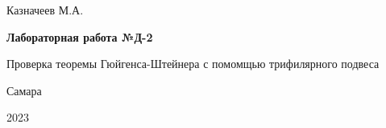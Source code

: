 \begin{titlepage}
	\begin{center}
		\Large{Казначеев М.А.}
	\end{center}
	\vspace*{\fill}
	\begin{center}
		\LARGE\textbf{Лабораторная работа №Д-2}
		
		\addvspace{1em}
		
		\Large{Проверка теоремы Гюйгенса-Штейнера с помомщью трифилярного подвеса}
		
	\end{center}
	\vspace*{\fill}
	\begin{center}
		\large{Самара}
		
		\large{2023}
	\end{center}
\end{titlepage}